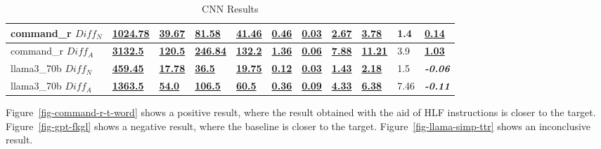 \documentclass[11pt]{article}
\begin{document}
\begin{table}[ht!]
{\begin{tabular}{lllllllllll}
            command\_r $Diff_N$  & \textbf{\underline{1024.78}} & \textbf{\underline{39.67}} & \textbf{\underline{81.58}}  & \textbf{\underline{41.46}} & \textbf{\underline{0.46}} & \textbf{\underline{0.03}} & \textbf{\underline{2.67}} & \textbf{\underline{3.78}}  & 1.4                     & \textbf{\underline{0.14}} \\ \midrule
            command\_r $Diff_A$  & \textbf{\underline{3132.5}}  & \textbf{\underline{120.5}} & \textbf{\underline{246.84}} & \textbf{\underline{132.2}} & \textbf{\underline{1.36}} & \textbf{\underline{0.06}} & \textbf{\underline{7.88}} & \textbf{\underline{11.21}} & 3.9                     & \textbf{\underline{1.03}} \\ \midrule
            llama3\_70b $Diff_N$ & \textbf{\underline{459.45}}  & \textbf{\underline{17.78}} & \textbf{\underline{36.5}}   & \textbf{\underline{19.75}} & \textbf{\underline{0.12}} & \textbf{\underline{0.03}} & \textbf{\underline{1.43}} & \textbf{\underline{2.18}}  & 1.5                     & \textbf{\textit{-0.06}}   \\ \midrule
            llama3\_70b $Diff_A$ & \textbf{\underline{1363.5}}  & \textbf{\underline{54.0}}  & \textbf{\underline{106.5}}  & \textbf{\underline{60.5}}  & \textbf{\underline{0.36}} & \textbf{\underline{0.09}} & \textbf{\underline{4.33}} & \textbf{\underline{6.38}}  & 7.46                    & \textbf{\textit{-0.11}}   \\ \bottomrule
        \end{tabular}%
    }\caption{CNN Results}\label{table-prompt-1-cnn-dailymail}
\end{table}

Figure~\ref{fig-command-r-t-word} shows a positive result, where the result
obtained with the aid of HLF instructions is closer to the target.
Figure~\ref{fig-gpt-fkgl} shows a negative result, where the baseline is closer
to the target.
Figure~\ref{fig-llama-simp-ttr} shows an inconclusive result.
\end{document}
